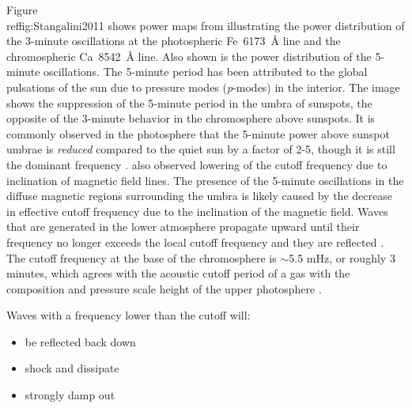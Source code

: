 

Figure~\\ref{fig:Stangalini2011} shows power maps from
\cite{Stangalini2011} illustrating the power distribution of the
3-minute oscillations at the photospheric Fe~6173~\AA{} line and the
chromospheric Ca~8542~\AA{} line. Also shown is the power distribution
of the 5-minute oscillations. The 5-minute period has been attributed
to the global pulsations of the sun due to pressure modes
(\textit{p}-modes) in the interior. The image shows the suppression of
the 5-minute period in the umbra of sunspots, the opposite of the
3-minute behavior in the chromosphere above sunspots. It is commonly
observed in the photosphere that the 5-minute power above sunspot
umbrae is \emph{reduced} compared to the quiet sun by a factor of 2-5,
though it is still the dominant frequency
\citep{Felipe2010, Bogdan2006}.
\cite{Reznikova2012} also observed lowering of the cutoff frequency
due to inclination of magnetic field lines.
The presence of the 5-minute oscillations in the diffuse magnetic regions
surrounding the umbra is likely caused by the decrease in effective
cutoff frequency due to the inclination of the magnetic field. Waves
that are generated in the lower atmosphere propagate upward until
their frequency no longer exceeds the local cutoff frequency and they
are reflected \citep{DeMoortel2000, Brynildsen1999}. The cutoff
frequency at the base of the chromosphere is $\sim$5.5 mHz, or roughly
3 minutes, which agrees with the acoustic cutoff period of a gas with
the composition and pressure scale height of the upper photosphere
\citep{Kalkofen1994}.

Waves with a frequency lower than the cutoff will:
\begin{itemize}
    \item be reflected back down
    \item shock and dissipate
    \item strongly damp out
\end{itemize}



